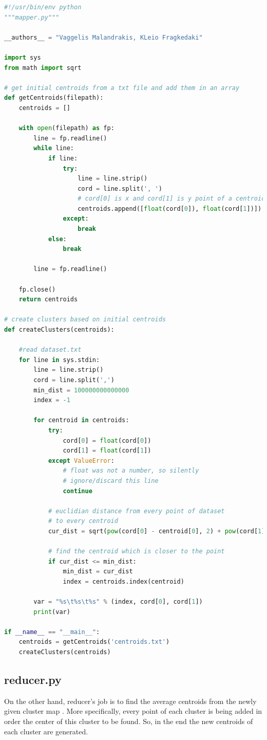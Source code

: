 \begin{lstlisting}[language=Python]
#!/usr/bin/env python
"""mapper.py"""

__authors__ = "Vaggelis Malandrakis, KLeio Fragkedaki"

import sys
from math import sqrt

# get initial centroids from a txt file and add them in an array
def getCentroids(filepath):
	centroids = []
	
	with open(filepath) as fp:
		line = fp.readline()
		while line:
			if line:
				try:
					line = line.strip()
					cord = line.split(', ')
					# cord[0] is x and cord[1] is y point of a centroid
					centroids.append([float(cord[0]), float(cord[1])])
				except:
					break
			else:
				break
	
		line = fp.readline()
	
	fp.close()
	return centroids
	
# create clusters based on initial centroids
def createClusters(centroids):

	#read dataset.txt
	for line in sys.stdin:
		line = line.strip()
		cord = line.split(',')
		min_dist = 100000000000000
		index = -1
		
		for centroid in centroids:
			try:
				cord[0] = float(cord[0])
				cord[1] = float(cord[1])
			except ValueError:
				# float was not a number, so silently
				# ignore/discard this line
				continue
			
			# euclidian distance from every point of dataset
			# to every centroid
			cur_dist = sqrt(pow(cord[0] - centroid[0], 2) + pow(cord[1] - centroid[1], 2))
			
			# find the centroid which is closer to the point
			if cur_dist <= min_dist:
				min_dist = cur_dist
				index = centroids.index(centroid)
	
		var = "%s\t%s\t%s" % (index, cord[0], cord[1])
		print(var)

if __name__ == "__main__":
	centroids = getCentroids('centroids.txt')
	createClusters(centroids)
\end{lstlisting}

\subsection{reducer.py}
 On the other hand, reducer's job is to find the average centroids from the newly given cluster map . More specifically, every point of each cluster is being added in order the center of this cluster to be found. So, in the end the new centroids of each cluster are generated.
 
